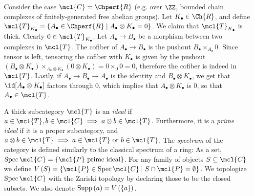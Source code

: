 \begin{example}
	Consider the case $\mcl{C} = \Chperf{R}$ (e.g. over $\ZZ$, bounded chain complexes of finitely-generated free abelian groups).
	Let $K_\bullet \in \Ch{R}$, and define
	$\mcl{T}_{K_\bullet} = \left\{ A_\bullet \in \Chperf{R} \mid A_\bullet \otimes K_\bullet = 0 \right\}$.
	We claim that $\mcl{T}_{K_\bullet}$ is thick.
	Clearly $0 \in \mcl{T}_{K_\bullet}$.
	Let $A_\bullet \to B_\bullet$ be a morphism between two complexes in $\mcl{T}$. The cofiber of $A_\bullet \to B_\bullet$ is the pushout $B_\bullet \times_{A_\bullet} 0$. Since tensor is left, tensoring the cofiber with $K_\bullet$ is given by the pushout
	$\left(B_\bullet \otimes K_\bullet\right) \times_{A_\bullet \otimes K_\bullet} \left(0 \otimes K_\bullet\right) = 0 \times_0 0 = 0$, therefore the cofiber is indeed in $\mcl{T}$.
	Lastly, if $A_\bullet \to B_\bullet \to A_\bullet$ is the identity and $B_\bullet \otimes K_\bullet$, we get that $\id[A_\bullet \otimes K_\bullet]$ factors through $0$, which implies that $A_\bullet \otimes K_\bullet$ is $0$, so that $A_\bullet \in \mcl{T}$.
\end{example}

\begin{definition}
	A thick subcategory $\mcl{T}$ is an \emph{ideal} if $a \in \mcl{T}, b \in \mcl{C} \implies a \otimes b \in \mcl{T}$.
	Furthermore, it is a \emph{prime ideal} if it is a proper subcategory, and $a \otimes b \in \mcl{T} \implies a \in \mcl{T} \textrm{ or } b \in \mcl{T}$.
	The \emph{spectrum} of the category is defined similarly to the classical spectrum of a ring:
	As a set, $\spec \mcl{C} = \left\{ \mcl{P}\textrm{ prime ideal} \right\}$.
	For any family of objects $S \subseteq \mcl{C}$ we define $V\left(S\right) = \left\{ \mcl{P} \in \spec \mcl{C} \mid S \cap \mcl{P} = \emptyset \right\}$.
	We topologize $\spec \mcl{C}$ with the Zariski topology by declaring those to be the closed subsets.
	We also denote $\operatorname{Supp}\left(a\right) = V\left(\left\{ a\right\}\right)$.
\end{definition}

